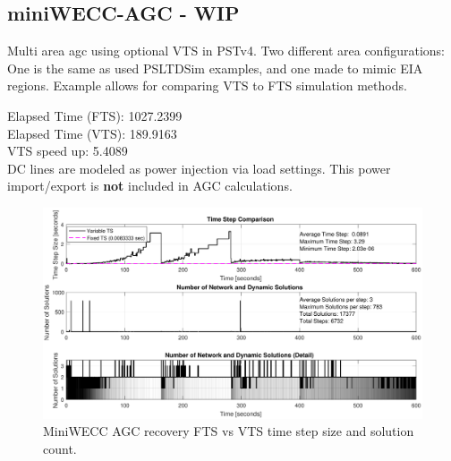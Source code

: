 \subsection{miniWECC-AGC - WIP} 
Multi area agc using optional VTS in PSTv4.
Two different area configurations: One is the same as used PSLTDSim examples, and one made to mimic EIA regions.
Example allows for comparing VTS to FTS simulation methods.

\noindent Elapsed Time (FTS):	 1027.2399\\
Elapsed Time (VTS):	 189.9163\\
VTS speed up: 5.4089\\

DC lines are modeled as power injection via load settings.
This power import/export is \textbf{not} included in AGC calculations.

\begin{figure}[H]
	\centering
	\footnotesize
	\includegraphics[width=\linewidth]{examples/miniWECC/mwAGC-timestep}
	\caption{MiniWECC AGC recovery FTS vs VTS time step size and solution count.}
	\label{fig: mwAGC steps}
\end{figure}%


